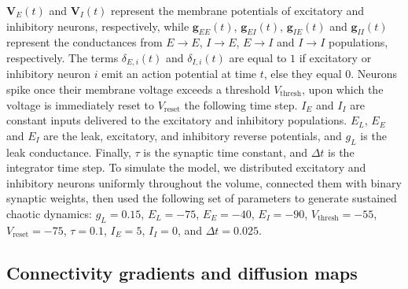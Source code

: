\documentclass{article}
\begin{document}
$\textbf{V}_{E}(t)$ and $\textbf{V}_{I}(t)$ represent the membrane potentials of excitatory and inhibitory neurons, respectively, while $\textbf{g}_{EE}(t)$, $\textbf{g}_{EI}(t)$, $\textbf{g}_{IE}(t)$ and $\textbf{g}_{II}(t)$ represent the conductances from $E\to E$, $I\to E$, $E\to I$ and $I\to I$ populations, respectively. The terms $\delta_{E,i}(t)$ and $\delta_{I,i}(t)$ are equal to $1$ if excitatory or inhibitory neuron $i$ emit an action potential at time $t$, else they equal 0. Neurons spike once their membrane voltage exceeds a threshold $V_{\text{thresh}}$, upon which the voltage is immediately reset to $V_{\text{reset}}$ the following time step. $I_E$ and $I_I$ are constant inputs delivered to the excitatory and inhibitory populations. $E_L$, $E_E$ and $E_I$ are the leak, excitatory, and inhibitory reverse potentials, and $g_L$ is the leak conductance. Finally, $\tau$ is the synaptic time constant, and $\Delta t$ is the integrator time step. To simulate the model, we distributed excitatory and inhibitory neurons uniformly throughout the volume, connected them with binary synaptic weights, then used the following set of parameters to generate sustained chaotic dynamics: $g_L=0.15$, $E_L=-75$, $E_E=-40$, $E_I=-90$, $V_{\text{thresh}}=-55$, $V_{\text{reset}}=-75$, $\tau=0.1$, $I_E=5$, $I_I=0$, and $\Delta t=0.025$.

\subsection*{Connectivity gradients and diffusion maps}
\end{document}
